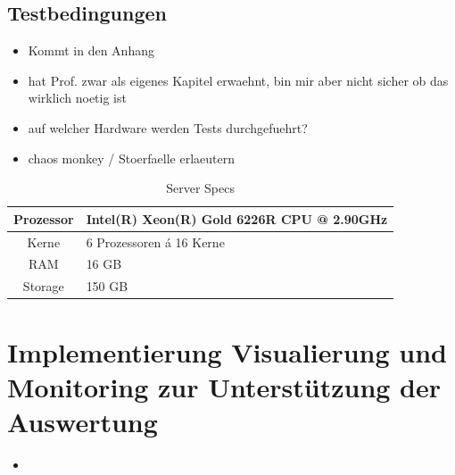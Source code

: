 \subsection{Testbedingungen}
\begin{itemize}
  \item Kommt in den Anhang
  \item hat Prof. zwar als eigenes Kapitel erwaehnt, bin mir aber nicht sicher ob das wirklich noetig ist
  \item auf welcher Hardware werden Tests durchgefuehrt?
  \item chaos monkey / Stoerfaelle erlaeutern
\end{itemize}

\begin{table}
  \centering
  \caption{Server Specs}
  \bigskip
  \begin{tabular}{ c l }
    \toprule
    Prozessor & Intel(R) Xeon(R) Gold 6226R CPU @ 2.90GHz \\
    \midrule
    Kerne & 6 Prozessoren á 16 Kerne \\
    \midrule
    RAM & 16 GB \\
    \midrule
    Storage & 150 GB \\
    \bottomrule
  \end{tabular}
\end{table}


\section{Implementierung Visualierung und Monitoring zur Unterst\"utzung der Auswertung}






\begin{itemize}
  \item 
\end{itemize}